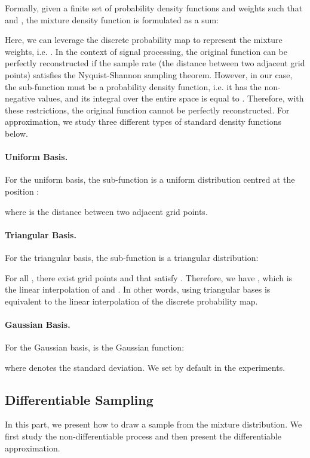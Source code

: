 \documentclass{article}
\begin{document}
Formally, given a finite set of probability density functions  and weights  such that  and , the mixture density function  is formulated as a sum:

Here, we can leverage the discrete probability map  to represent the mixture weights, i.e. . In the context of signal processing, the original function can be perfectly reconstructed if the sample rate (the distance between two adjacent grid points) satisfies the Nyquist-Shannon sampling theorem. However, in our case, the sub-function  must be a probability density function, i.e. it has the non-negative values, and its integral over the entire space is equal to . Therefore, with these restrictions, the original function  cannot be perfectly reconstructed. For approximation, we study three different types of standard density functions below.



\paragraph{Uniform Basis.} For the uniform basis, the sub-function  is a uniform distribution centred at the position :

where  is the distance between two adjacent grid points.



\paragraph{Triangular Basis.} For the triangular basis, the sub-function  is a triangular distribution:

For all , there exist grid points  and  that satisfy . Therefore, we have , which is the linear interpolation of  and . In other words, using triangular bases is equivalent to the linear interpolation of the discrete probability map.



\paragraph{Gaussian Basis.} For the Gaussian basis,  is the Gaussian function:

where  denotes the standard deviation. We set  by default in the experiments.





\subsection{Differentiable Sampling}\label{sec:sample}
In this part, we present how to draw a sample from the mixture distribution. We first study the non-differentiable process and then present the differentiable approximation.
\end{document}
